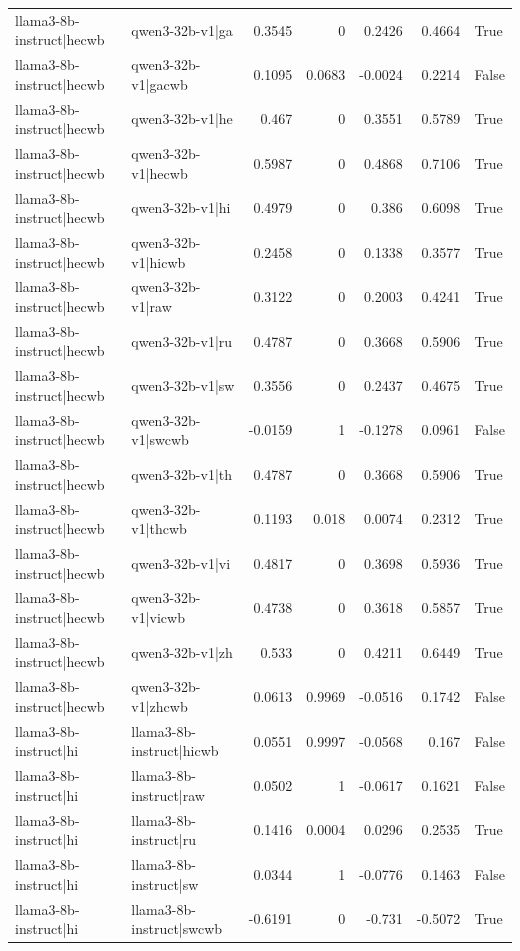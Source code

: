 \begin{table}
\begin{tabular}{l l r r r r l}
llama3-8b-instruct|hecwb & qwen3-32b-v1|ga & 0.3545 & 0 & 0.2426 & 0.4664 & True \\
llama3-8b-instruct|hecwb & qwen3-32b-v1|gacwb & 0.1095 & 0.0683 & -0.0024 & 0.2214 & False \\
llama3-8b-instruct|hecwb & qwen3-32b-v1|he & 0.467 & 0 & 0.3551 & 0.5789 & True \\
llama3-8b-instruct|hecwb & qwen3-32b-v1|hecwb & 0.5987 & 0 & 0.4868 & 0.7106 & True \\
llama3-8b-instruct|hecwb & qwen3-32b-v1|hi & 0.4979 & 0 & 0.386 & 0.6098 & True \\
llama3-8b-instruct|hecwb & qwen3-32b-v1|hicwb & 0.2458 & 0 & 0.1338 & 0.3577 & True \\
llama3-8b-instruct|hecwb & qwen3-32b-v1|raw & 0.3122 & 0 & 0.2003 & 0.4241 & True \\
llama3-8b-instruct|hecwb & qwen3-32b-v1|ru & 0.4787 & 0 & 0.3668 & 0.5906 & True \\
llama3-8b-instruct|hecwb & qwen3-32b-v1|sw & 0.3556 & 0 & 0.2437 & 0.4675 & True \\
llama3-8b-instruct|hecwb & qwen3-32b-v1|swcwb & -0.0159 & 1 & -0.1278 & 0.0961 & False \\
llama3-8b-instruct|hecwb & qwen3-32b-v1|th & 0.4787 & 0 & 0.3668 & 0.5906 & True \\
llama3-8b-instruct|hecwb & qwen3-32b-v1|thcwb & 0.1193 & 0.018 & 0.0074 & 0.2312 & True \\
llama3-8b-instruct|hecwb & qwen3-32b-v1|vi & 0.4817 & 0 & 0.3698 & 0.5936 & True \\
llama3-8b-instruct|hecwb & qwen3-32b-v1|vicwb & 0.4738 & 0 & 0.3618 & 0.5857 & True \\
llama3-8b-instruct|hecwb & qwen3-32b-v1|zh & 0.533 & 0 & 0.4211 & 0.6449 & True \\
llama3-8b-instruct|hecwb & qwen3-32b-v1|zhcwb & 0.0613 & 0.9969 & -0.0516 & 0.1742 & False \\
llama3-8b-instruct|hi & llama3-8b-instruct|hicwb & 0.0551 & 0.9997 & -0.0568 & 0.167 & False \\
llama3-8b-instruct|hi & llama3-8b-instruct|raw & 0.0502 & 1 & -0.0617 & 0.1621 & False \\
llama3-8b-instruct|hi & llama3-8b-instruct|ru & 0.1416 & 0.0004 & 0.0296 & 0.2535 & True \\
llama3-8b-instruct|hi & llama3-8b-instruct|sw & 0.0344 & 1 & -0.0776 & 0.1463 & False \\
llama3-8b-instruct|hi & llama3-8b-instruct|swcwb & -0.6191 & 0 & -0.731 & -0.5072 & True \\

\end{tabular}
\end{table}
